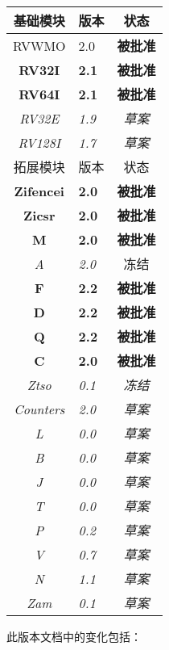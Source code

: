 {
\begin{table}[hbt]
  \centering
  \begin{tabular}{|c|l|c|}
    \hline
    基础模块       & 版本   & 状态\\
    \hline
    RVWMO          & 2.0 & \bf 被批准   \\
    \bf RV32I      & \bf 2.1 & \bf 被批准 \\
    \bf RV64I      & \bf 2.1 & \bf 被批准 \\
    \em RV32E      & \em 1.9 & \em 草案 \\
    \em RV128I     & \em 1.7 & \em 草案 \\
    \hline
    拓展模块       &  版本   &     状态    \\
    \hline
    \bf Zifencei   & \bf 2.0 & \bf 被批准 \\
    \bf Zicsr      & \bf 2.0 & \bf 被批准 \\
    \bf M          & \bf 2.0 & \bf 被批准 \\
    \em A          & \em 2.0 &  冻结 \\
    \bf F          & \bf 2.2 & \bf 被批准 \\
    \bf D          & \bf 2.2 & \bf 被批准 \\
    \bf Q          & \bf 2.2 & \bf 被批准 \\
    \bf C          & \bf 2.0 & \bf 被批准 \\
    \em Ztso       & \em 0.1 & \em 冻结 \\
    \em Counters   & \em 2.0 & \em 草案 \\
    \em L          & \em 0.0 & \em 草案 \\
    \em B          & \em 0.0 & \em 草案 \\
    \em J          & \em 0.0 & \em 草案 \\
    \em T          & \em 0.0 & \em 草案 \\
    \em P          & \em 0.2 & \em 草案 \\
    \em V          & \em 0.7 & \em 草案 \\
    \em N          & \em 1.1 & \em 草案 \\
    \em Zam        & \em 0.1 & \em 草案 \\
    \hline
  \end{tabular}
\end{table}
}

此版本文档中的变化包括：

